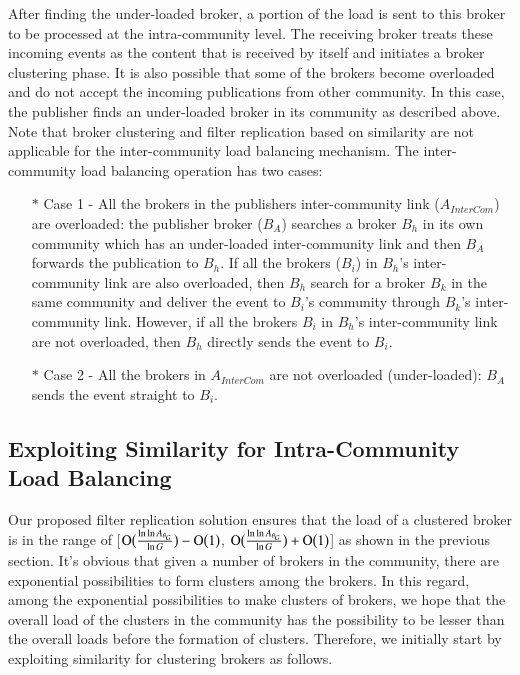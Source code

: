 After finding the under-loaded broker, a portion of the load is sent to this broker to be processed at the intra-community level. The receiving broker treats these incoming events as the content that is received by itself and initiates a broker clustering phase. It is also possible that some of the brokers become overloaded and do not accept the incoming publications from other community. In this case, the publisher finds an under-loaded broker in its community as described above. Note that broker clustering and filter replication based on similarity are not applicable for the inter-community load balancing mechanism. The inter-community load balancing operation has two cases:
\begin{enumerate}
  \item[$\ast$]Case 1 - All the brokers in the publishers inter-community link ($A_{InterCom}$) are overloaded: the publisher broker ($B_A$) searches a broker $B_h$ in its own community which has an under-loaded inter-community link and then $B_A$ forwards the publication to $B_h$. If all the brokers ($B_i$) in $B_h$'s inter-community link are also overloaded, then $B_h$ search for a broker $B_k$ in the same community and deliver the event to $B_i$'s community through $B_k$'s inter-community link. However, if all the brokers $B_i$ in $B_h$'s inter-community link are not overloaded, then $B_h$ directly sends the event to $B_i$.
  \item[$\ast$]Case 2 - All the brokers in $A_{InterCom}$ are not overloaded (under-loaded): $B_A$ sends the event straight to $B_i$.
\end{enumerate}

\subsection{Exploiting Similarity for Intra-Community Load Balancing}\label{Chap5_04_02}

Our proposed filter replication solution ensures that the load of a clustered broker is in the range of [$\operatorname{O}\bigl(\frac{\ln\ln A_{\theta_G}}{\ln G}\bigr) - \operatorname{O}\bigl(1\bigr)$, $\operatorname{O}\bigl(\frac{\ln\ln A_{\theta_G}}{\ln G}\bigr) + \operatorname{O}\bigl(1\bigr)$] as shown in the previous section. It's obvious that given a number of brokers in the community, there are exponential possibilities to form clusters among the brokers. In this regard, among the exponential possibilities to make clusters of brokers, we hope that the overall load of the clusters in the community has the possibility to be lesser than the overall loads before the formation of clusters. Therefore, we initially start by exploiting similarity for clustering brokers as follows.

